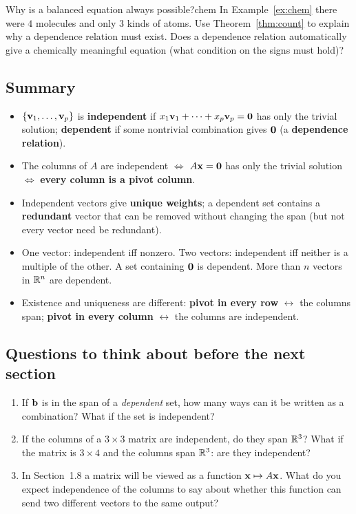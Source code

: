 \documentclass[11pt]{article}
\begin{document}
\begin{think}{Why is a balanced equation always possible?}{chem}
In Example~\ref{ex:chem} there were $4$ molecules and only $3$ kinds of atoms. Use Theorem~\ref{thm:count} to explain why a dependence relation must exist. Does a dependence relation automatically give a chemically meaningful equation (what condition on the signs must hold)?
\end{think}

\subsection*{Summary}
\begin{itemize}
  \item $\{\mathbf{v}_1,\dots,\mathbf{v}_p\}$ is \textbf{independent} if $x_1\mathbf{v}_1+\cdots+x_p\mathbf{v}_p=\mathbf{0}$ has only the trivial solution; \textbf{dependent} if some nontrivial combination gives $\mathbf{0}$ (a \textbf{dependence relation}).
  \item The columns of $A$ are independent $\iff$ $A\mathbf{x}=\mathbf{0}$ has only the trivial solution $\iff$ \textbf{every column is a pivot column}.
  \item Independent vectors give \textbf{unique weights}; a dependent set contains a \textbf{redundant} vector that can be removed without changing the span (but not every vector need be redundant).
  \item One vector: independent iff nonzero. Two vectors: independent iff neither is a multiple of the other. A set containing $\mathbf{0}$ is dependent. More than $n$ vectors in $\mathbb{R}^n$ are dependent.
  \item Existence and uniqueness are different: \textbf{pivot in every row} $\leftrightarrow$ the columns span; \textbf{pivot in every column} $\leftrightarrow$ the columns are independent.
\end{itemize}

\subsection*{Questions to think about before the next section}
\begin{enumerate}
  \item If $\mathbf{b}$ is in the span of a \emph{dependent} set, how many ways can it be written as a combination? What if the set is independent?
  \item If the columns of a $3\times3$ matrix are independent, do they span $\mathbb{R}^3$? What if the matrix is $3\times4$ and the columns span $\mathbb{R}^3$: are they independent?
  \item In Section~1.8 a matrix will be viewed as a function $\mathbf{x}\mapsto A\mathbf{x}$. What do you expect independence of the columns to say about whether this function can send two different vectors to the same output?
\end{enumerate}
\end{document}
